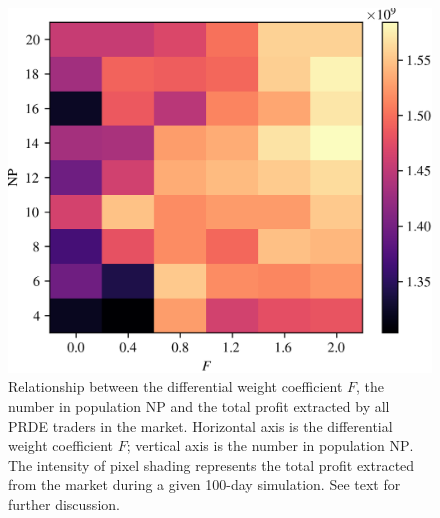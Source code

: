 \documentclass[conference]{IEEEtran}
\begin{document}
\begin{figure}[htbp]
    \centerline{\includegraphics[width=\columnwidth]{profit_grid.png}}
    \caption{
        Relationship between the differential weight coefficient $F$, the number in population $\mathrm{NP}$ and the total profit extracted by all PRDE traders in the market.
        Horizontal axis is the differential weight coefficient $F$; vertical axis is the number in population $\mathrm{NP}$.
        The intensity of pixel shading represents the total profit extracted from the market during a given 100-day simulation.
        See text for further discussion.
    }
    \label{profit_grid}
\end{figure}
\end{document}
